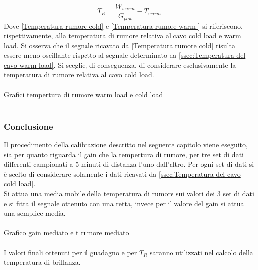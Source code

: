 \begin{equation}
T_{R} = \dfrac{W_{warm}}{G_{plot}}-T_{warm}
\label{Temperatura rumore warm}
\end{equation}
Dove \eqref{Temperatura rumore cold} e \eqref{Temperatura rumore warm } si riferiscono, rispettivamente, alla temperatura di rumore relativa al cavo cold load e warm load.
Si osserva che il segnale ricavato da \eqref{Temperatura rumore cold} risulta essere meno oscillante rispetto al segnale determinato da \eqref{ssec:Temperatura del cavo warm load}. Si sceglie, di conseguenza, di considerare esclusivamente la temperatura di rumore relativa al cavo cold load.
\\\\
Grafici tempertura di rumore warm load e cold load
\\\\

\subsubsection{Conclusione}
Il procedimento della calibrazione descritto nel seguente capitolo viene eseguito, sia per quanto riguarda il gain che la tempertura di rumore, per tre set di dati differenti campionati a 5 minuti di distanza l'uno dall'altro. Per ogni set di dati si è scelto di considerare solamente i dati ricavati da \eqref{ssec:Temperatura del cavo cold load}.\\
Si attua una media mobile della temperatura di rumore sui  valori dei 3 set di dati e si fitta il segnale ottenuto con una retta, invece per il valore del gain si attua una semplice media.
\\\\
Grafico gain mediato e t rumore mediato
\\\\
I valori finali ottenuti per il guadagno e per $T_{R}$ saranno utilizzati nel calcolo della temperatura di brillanza.
